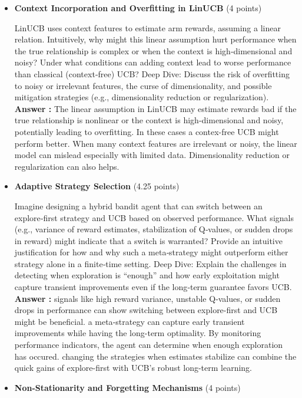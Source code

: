 \documentclass[12pt]{article}
\begin{document}
{{{\begin{itemize}[noitemsep]
    \item \textbf{Context Incorporation and Overfitting in LinUCB} (4 points)

    \vspace{0.25cm}
    LinUCB uses context features to estimate arm rewards, assuming a linear relation. Intuitively, why might this linear assumption hurt performance when the true relationship is complex or when the context is high‑dimensional and noisy? Under what conditions can adding context lead to worse performance than classical (context‑free) UCB?
    Deep Dive:
    Discuss the risk of overfitting to noisy or irrelevant features, the curse of dimensionality, and possible mitigation strategies (e.g., dimensionality reduction or regularization).\\
    \textbf{Answer :} The linear assumption in LinUCB may estimate rewards bad if the true relationship is nonlinear or the context is high-dimensional and noisy, potentially leading to overfitting. In these cases a contex-free UCB might perform better.
    When many context features are irrelevant or noisy, the linear model can mislead especially with limited data. Dimensionality reduction or regularization can also helps.
    \vspace{0.5cm}
    \item \textbf{Adaptive Strategy Selection} (4.25 points)

    \vspace{0.25cm}
    Imagine designing a hybrid bandit agent that can switch between an explore‑first strategy and UCB based on observed performance. What signals (e.g., variance of reward estimates, stabilization of Q‑values, or sudden drops in reward) might indicate that a switch is warranted? Provide an intuitive justification for how and why such a meta‑strategy might outperform either strategy alone in a finite‑time setting.
    Deep Dive:
    Explain the challenges in detecting when exploration is “enough” and how early exploitation might capture transient improvements even if the long‑term guarantee favors UCB.\\
    \textbf{Answer :} signals like high reward variance, unstable Q‑values, or sudden drops in performance can show switching between explore-first and UCB might be beneficial. a meta‑strategy can capture early transient improvements while having the long-term optimality.
    By monitoring performance indicators, the agent can determine when enough exploration has occured. changing the strategies when estimates stabilize can combine the quick gains of explore-first with UCB's robust long-term learning.
    \vspace{0.5cm}
    \item \textbf{Non-Stationarity and Forgetting Mechanisms} (4 points)


\end{itemize}}}}
\end{document}
